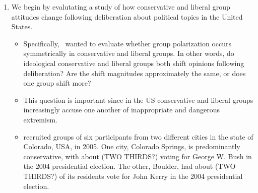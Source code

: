 \documentclass[11pt,letterpaper]{article}
\begin{document}
\begin{enumerate}
  \item 
    We begin by evalutating a study of how conservative and liberal 
    group attitudes change following deliberation about political topics
    in the United States. 
    \begin{itemize}
      \item 
        Specifically,~ wanted to evaluate whether group 
        polarization occurs symmetrically in conservative and liberal groups.
        In other words, do ideological conservative and liberal groups both
        shift opinions following deliberation? Are the shift magnitudes 
        approximately the same, or does one group shift more?
      \item
        This question is important since in the US conservative and liberal
        groups increasingly accuse one another of inappropriate and
        dangerous extremism.
      \item
         recruited groups of six participants from
        two different cities in the state of Colorado, USA, in 2005. One city,
        Colorado Springs, is predominantly conservative, with about (TWO THIRDS?)
        voting for George W. Bush in the 2004 presidential election. The other,
        Boulder, had about (TWO THIRDS?) of its residents vote for John Kerry
        in the 2004 presidential election. 
    \end{itemize}
      

\end{enumerate}
\end{document}
